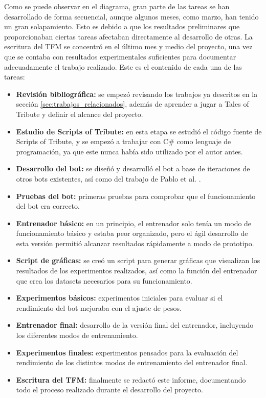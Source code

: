 Como se puede observar en el diagrama, gran parte de las tareas se han desarrollado de forma secuencial, aunque algunos meses, como marzo, han tenido un gran solapamiento. Esto es debido a que los resultados preliminares que proporcionaban ciertas tareas afectaban directamente al desarrollo de otras. La escritura del TFM se concentró en el último mes y medio del proyecto, una vez que se contaba con resultados experimentales suficientes para documentar adecuadamente el trabajo realizado. Este es el contenido de cada una de las tareas:
\begin{itemize}
	\item \textbf{Revisión bibliográfica:} se empezó revisando los trabajos ya descritos en la sección \ref{sec:trabajos_relacionados}, además de aprender a jugar a Tales of Tribute y definir el alcance del proyecto.
	\item \textbf{Estudio de Scripts of Tribute:} en esta etapa se estudió el código fuente de Scripts of Tribute, y se empezó a trabajar con C\# como lenguaje de programación, ya que este nunca había sido utilizado por el autor antes.
	\item \textbf{Desarrollo del bot:} se diseñó y desarrolló el bot a base de iteraciones de otros bots existentes, así como del trabajo de Pablo et al. \cite{garcia-sanchez_optimizing_2020}.
	\item \textbf{Pruebas del bot:} primeras pruebas para comprobar que el funcionamiento del bot era correcto.
	\item \textbf{Entrenador básico:} en un principio, el entrenador solo tenía un modo de funcionamiento básico y estaba peor organizado, pero el ágil desarrollo de esta versión permitió alcanzar resultados rápidamente a modo de prototipo.
	\item \textbf{Script de gráficas:} se creó un script para generar gráficas que visualizan los resultados de los experimentos realizados, así como la función del entrenador que crea los datasets necesarios para su funcionamiento.
	\item \textbf{Experimentos básicos:} experimentos iniciales para evaluar si el rendimiento del bot mejoraba con el ajuste de pesos.
	\item \textbf{Entrenador final:} desarrollo de la versión final del entrenador, incluyendo los diferentes modos de entrenamiento.
	\item \textbf{Experimentos finales:} experimentos pensados para la evaluación del rendimiento de los distintos modos de entrenamiento del entrenador final.
	\item \textbf{Escritura del TFM:} finalmente se redactó este informe, documentando todo el proceso realizado durante el desarrollo del proyecto.
\end{itemize}